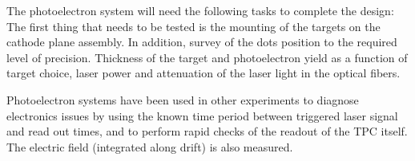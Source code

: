 The photoelectron system will need the following tasks to complete the design: The first thing that needs to be tested is the mounting of the targets on the cathode plane assembly. In addition, survey of the dots position to the required level of precision. Thickness of the target and photoelectron yield as a function of target choice, laser power and attenuation of the laser light in the optical fibers.

\label{sec:sp-calib-sys-las-pe-meas}

Photoelectron systems have been used in other experiments to diagnose electronics issues by using the known time period between triggered laser signal and read out times, and to perform rapid checks of the readout of the TPC itself. The electric field (integrated along drift) is also measured.

